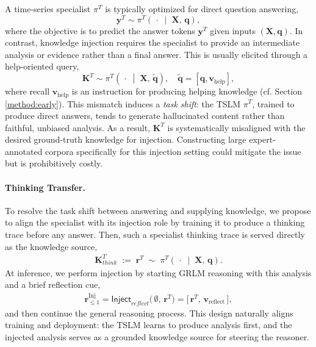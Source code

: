 \documentclass[twoside]{article}
\begin{document}
A time-series specialist \(\pi^{T}\) is typically optimized for direct question answering,  
\[
\mathbf{y}^{T} \sim \pi^{T}\!\left(\,\cdot \;\middle|\; \mathbf{X},\, \mathbf{q}\right),
\]  
where the objective is to predict the answer tokens \(\mathbf{y}^{T}\) given inputs \((\mathbf{X},\mathbf{q})\).  
In contrast, knowledge injection requires the specialist to provide an intermediate analysis or evidence rather than a final answer. This is usually elicited through a help-oriented query,  
\[
\mathbf{K}^{T} \sim \pi^{T}\!\left(\,\cdot \;\middle|\; \mathbf{X},\, \mathbf{\tilde{q}}\right), \quad 
\mathbf{\tilde{q}} = [\mathbf{q}, \mathbf{v}_{\mathrm{help}}],
\]  
where recall \(\mathbf{v}_{\mathrm{help}}\) is an instruction for producing helping knowledge (cf. Section \ref{method:early}). This mismatch induces a \emph{task shift}: the TSLM $\pi^{T}$, trained to produce direct answers, tends to generate hallucinated content rather than faithful, unbiased analysis. As a result, \(\mathbf{K}^{T}\) is systematically misaligned with the desired ground-truth knowledge for injection. Constructing large expert-annotated corpora specifically for this injection setting could mitigate the issue but is prohibitively costly.

\paragraph{Thinking Transfer.}
To resolve the task shift between answering and supplying knowledge, we propose to align the specialist with its injection role by training it to produce a thinking trace before any answer. Then, such a specialist thinking trace is served directly as the knowledge source, 
\begin{align}
\label{eq:TSLM_think}
\mathbf{K}^{T}_{think} \;:=\; \mathbf{r}^{T}  \;\sim\; \pi^{T}\!\left(\,\cdot \;\middle|\; \mathbf{X},\, \mathbf{q}\right).
\end{align}
At inference, we perform injection by starting GRLM reasoning with this analysis and a brief reflection cue,
\begin{align}
\label{eq:early_injection}
\mathbf{r}^{\mathrm{Inj}}_{\le 1}
=
\mathsf{Inject}_{reflect}\!\big(\,\emptyset,\, \mathbf{r}^{T}\big)
=
\big[\, \mathbf{r}^{T},\, \boldsymbol{v}_{\mathrm{reflect}}\,\big],
\end{align}
and then continue the general reasoning process. This design naturally aligns training and deployment: the TSLM learns to produce analysis first, and the injected analysis serves as a grounded knowledge source for steering the reasoner.
\end{document}
